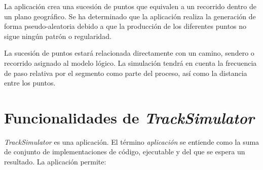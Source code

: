 La aplicación crea una sucesión de puntos que equivalen a un recorrido dentro de un plano geográfico. 
Se ha determinado que la aplicación realiza la generación de forma pseudo-aleatoria debido a que 
la producción de los diferentes puntos no sigue ningún patrón o regularidad.

La sucesión de puntos estará relacionada directamente con un camino, sendero o recorrido asignado al 
modelo lógico. La simulación tendrá en cuenta la frecuencia de paso relativa por el segmento como parte
del proceso, así como la distancia entre los puntos.


\section{Funcionalidades de \textit{TrackSimulator}}
\textit{TrackSimulator} es una aplicación. El término \textit{aplicación} se entiende como la suma de 
conjunto de implementaciones  de código, ejecutable y del que se espera un resultado. La aplicación 
permite:
